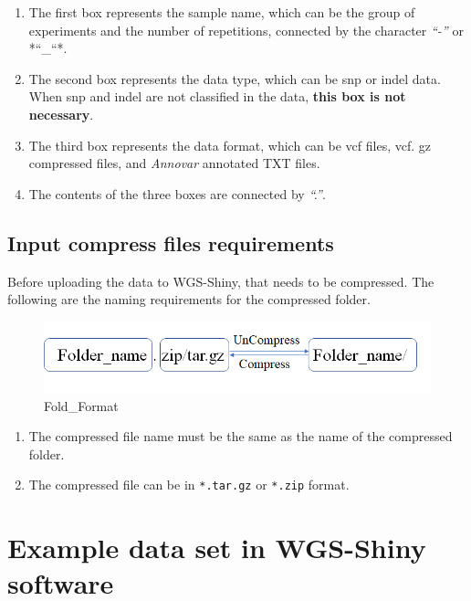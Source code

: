 \documentclass[
]{book}
\providecommand{\tightlist}{%
  \setlength{\itemsep}{0pt}\setlength{\parskip}{0pt}}
\theoremstyle{definition}
\theoremstyle{definition}
\theoremstyle{definition}
\theoremstyle{definition}
\theoremstyle{remark}
\begin{document}
\begin{enumerate}
\def\labelenumi{\arabic{enumi}.}
\tightlist
\item
  The first box represents the sample name, which can be the group of experiments and the number of repetitions, connected by the character \emph{``-''} or *``\_``*.
\item
  The second box represents the data type, which can be snp or indel data. When snp and indel are not classified in the data, \textbf{this box is not necessary}.
\item
  The third box represents the data format, which can be vcf files, vcf. gz compressed files, and \emph{Annovar} annotated TXT files.
\item
  The contents of the three boxes are connected by \emph{``.''}.
\end{enumerate}

\hypertarget{input-compress-files-requirements}{%
\subsection{Input compress files requirements}\label{input-compress-files-requirements}}

Before uploading the data to WGS-Shiny, that needs to be compressed. The following are the naming requirements for the compressed folder.

\begin{figure}
\includegraphics[width=0.8\linewidth]{figure/Fold_Format} \caption{Fold_Format}\label{fig:unnamed-chunk-5}
\end{figure}

\begin{enumerate}
\def\labelenumi{\arabic{enumi}.}
\tightlist
\item
  The compressed file name must be the same as the name of the compressed folder.
\item
  The compressed file can be in \texttt{*.tar.gz} or \texttt{*.zip} format.
\end{enumerate}

\hypertarget{example-data-set-in-wgs-shiny-software}{%
\section{Example data set in WGS-Shiny software}\label{example-data-set-in-wgs-shiny-software}}
\end{document}
